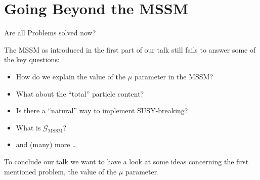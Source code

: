 \section{Going Beyond the MSSM}

\begin{frame}{Are all Problems solved now?}
\addtocounter{framenumber}{-1}
	The MSSM as introduced in the first part of our talk still fails to answer some of the key questions:\\[1em]

\begin{itemize}
	\item How do we explain the value of the $\mu$ parameter in the MSSM?\\[1em]
	\item What about the \enquote{total} particle content?\\[1em]
	\item Is there a \enquote{natural} way to implement SUSY-breaking?\\[1em]
	\item What is $\mathcal{G}_{\mathrm{MSSM}}$?\\[1em]
	\item and (many) more \dots\\[1em]
 \end{itemize}
To conclude our talk we want to have a look at some ideas concerning the first mentioned problem, the value of the $\mu$ parameter. 
\end{frame}
